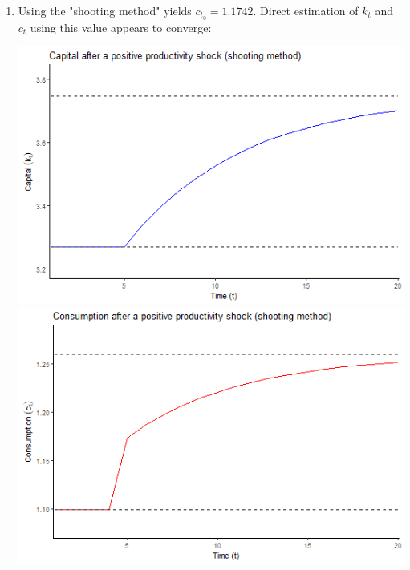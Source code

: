 \documentclass{article}
\begin{document}
\begin{enumerate}
\begin{enumerate}
\begin{enumerate}
					\item Using the "shooting method" yields $c_{t_0}=1.1742$. Direct estimation of $k_t$ and $c_t$ using this value appears to converge:
						\begin{center}
							\includegraphics[scale=.6]{problem1.6b_timeplot_k.png}
							\includegraphics[scale=.6]{problem1.6b_timeplot_c.png}
						\end{center}
				\end{enumerate}
		\end{enumerate}
\end{enumerate}


\end{document}
